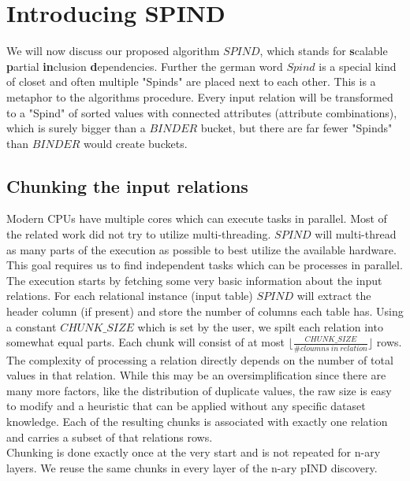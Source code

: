 \section{Introducing SPIND}

We will now discuss our proposed algorithm $SPIND$, which stands for \textbf{s}calable \textbf{p}artial \textbf{in}clusion \textbf{d}ependencies. Further the german word $Spind$ is a special kind of closet and often multiple "Spinds" are placed next to each other. This is a metaphor to the algorithms procedure. Every input relation will be transformed to a "Spind" of sorted values with connected attributes (attribute combinations), which is surely bigger than a $BINDER$ bucket, but there are far fewer "Spinds" than $BINDER$ would create buckets.

\subsection{Chunking the input relations}
Modern CPUs have multiple cores which can execute tasks in parallel. Most of the related work did not try to utilize multi-threading. $SPIND$ will multi-thread as many parts of the execution as possible to best utilize the available hardware. This goal requires us to find independent tasks which can be processes in parallel. \\

\noindent The execution starts by fetching some very basic information about the input relations. For each relational instance (input table) $SPIND$ will extract the header column (if present) and store the number of columns each table has. Using a constant $CHUNK\_SIZE$ which is set by the user, we spilt each relation into somewhat equal parts. Each chunk will consist of at most $\lfloor \frac{CHUNK\_SIZE}{\# cloumns \: in \: relation} \rfloor$ rows. The complexity of processing a relation directly depends on the number of total values in that relation. While this may be an oversimplification since there are many more factors, like the distribution of duplicate values, the raw size is easy to modify and a heuristic that can be applied without any specific dataset knowledge. Each of the resulting chunks is associated with exactly one relation and carries a subset of that relations rows. \\

\noindent Chunking is done exactly once at the very start and is not repeated for n-ary layers. We reuse the same chunks in every layer of the n-ary pIND discovery. \\

